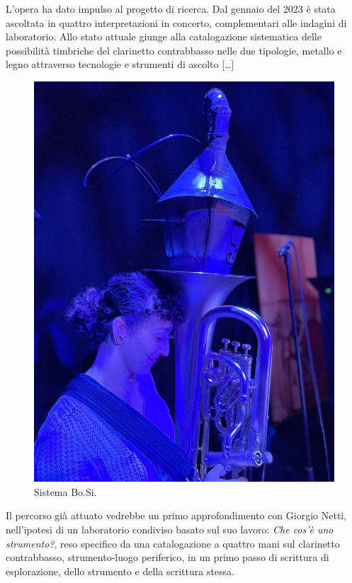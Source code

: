 \documentclass{gs-adonis}
\begin{document}
L'opera ha dato impulso al progetto di ricerca. Dal gennaio del 2023 è stata
ascoltata in quattro interpretazioni in concerto, complementari alle indagini
di laboratorio. Allo stato attuale giunge alla catalogazione sistematica delle
possibilità timbriche del clarinetto contrabbasso nelle due tipologie, metallo
e legno attraverso tecnologie e strumenti di ascolto [\ldots]

\begin{figure}[t]
  \centering
  \includegraphics[width=\linewidth]{images/IMG_F5A47D566D6E-31.jpeg}
  \captionsetup{width=.81\linewidth}
  \caption{Sistema Bo.Si.}
  \label{bosi}
\end{figure}

Il percorso già attuato vedrebbe un primo approfondimento con Giorgio Netti,
nell'ipotesi di un laboratorio condiviso basato sul suo lavoro:
\emph{Che cos'è uno strumento?}\cite{netti23}, reso specifico da una catalogazione
a quattro mani sul clarinetto contrabbasso, strumento-luogo periferico, in un
primo passo di scrittura di esplorazione, dello strumento e della scrittura
stessa.
\end{document}
